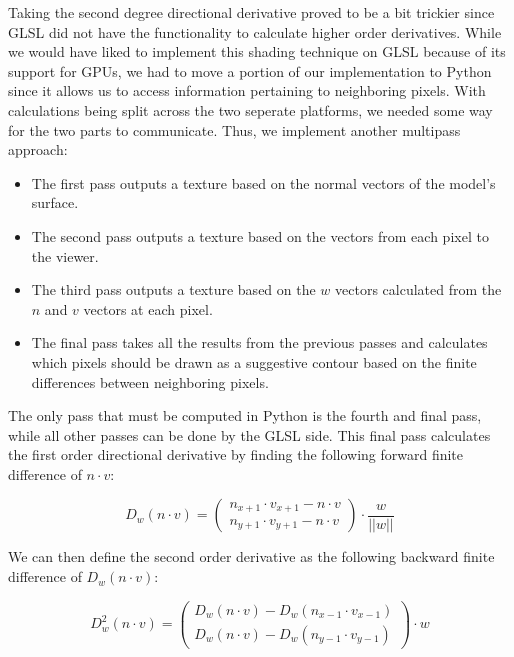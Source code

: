 \documentclass[10pt,twocolumn,letterpaper]{article}
\begin{document}
Taking the second degree directional derivative proved to be a bit trickier since GLSL did not have the functionality to calculate higher order derivatives. While we would have liked to implement this shading technique on GLSL because of its support for GPUs, we had to move a portion of our implementation to Python since it allows us to access information pertaining to neighboring pixels. With calculations being split across the two seperate platforms, we needed some way for the two parts to communicate. Thus, we implement another multipass approach:

\begin{itemize}
    \item The first pass outputs a texture based on the normal vectors of the model's surface.
    \item The second pass outputs a texture based on the vectors from each pixel to the viewer.
    \item The third pass outputs a texture based on the $w$ vectors calculated from the $n$ and $v$ vectors at each pixel.
    \item The final pass takes all the results from the previous passes and calculates which pixels should be drawn as a suggestive contour based on the finite differences between neighboring pixels.
\end{itemize}

The only pass that must be computed in Python is the fourth and final pass, while all other passes can be done by the GLSL side. This final pass calculates the first order directional derivative by finding the following forward finite difference of $n \cdot v$:

\begin{equation}
    D_w(n \cdot v) = 
    \begin{pmatrix}
        n_{x+1} \cdot v_{x+1} - n \cdot v\\
        n_{y+1} \cdot v_{y+1} - n \cdot v
    \end{pmatrix}
    \cdot \frac{w}{||w||}
    \label{eq:first-python}
\end{equation}

We can then define the second order derivative as the following backward finite difference of $D_w(n \cdot v)$:

\begin{equation}
    D_w^2(n \cdot v) = 
    \begin{pmatrix}
        D_w(n \cdot v) - D_w(n_{x-1} \cdot v_{x-1})\\
        D_w(n \cdot v) - D_w(n_{y-1} \cdot v_{y-1})
    \end{pmatrix}
    \cdot w
    \label{eq:second-python}
\end{equation}
\end{document}
